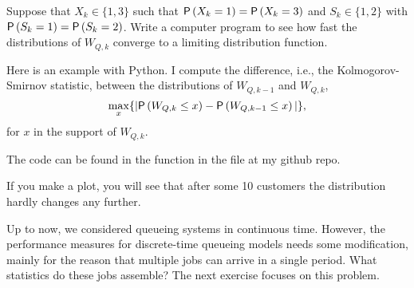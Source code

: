 \begin{exercise}
 Suppose that $X_k\in\{1,3\}$ such that $\P{X_k=1}=\P{X_k=3}$ and
 $S_k\in\{1,2\}$ with $\P{S_k=1}=\P{S_k=2}$. Write a computer program
 to see how fast the distributions of $W_{Q,k}$ converge to a limiting distribution function.
\begin{solution}
 Here is an example with Python.
 I compute the difference, i.e., the Kolmogorov-Smirnov statistic, between the distributions of $W_{Q,k-1}$ and $W_{Q,k}$,
\begin{equation*}
 \max_x\{ |\P{W_{Q,k}\leq x} - \P{W_{Q,k-1}\leq x}|\},
\end{equation*}
for $x$ in the support of $W_{Q,k}$. 

The code can be found in the  function in the file  at
my github repo.

If you make a plot, you will see that after some 10 customers the distribution hardly changes any further. 

\end{solution}
\end{exercise}



Up to now, we considered queueing systems in continuous time.
However, the performance measures for discrete-time queueing models needs some modification, mainly for the reason that multiple jobs can arrive in a single period.
What statistics do these jobs assemble?
The next exercise focuses on this problem.

